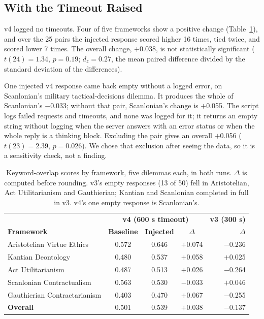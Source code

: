 \documentclass[11pt,a4paper]{article}
\begin{document}
\subsection{With the Timeout Raised}

v4 logged no timeouts. Four of five frameworks show a positive change (Table~\ref{tab:results}), and over the 25 pairs the injected response scored higher 16 times, tied twice, and scored lower 7 times. The overall change, $+$0.038, is not statistically significant ($t(24){=}1.34$, $p{=}0.19$; $d_z{=}0.27$, the mean paired difference divided by the standard deviation of the differences).

One injected v4 response came back empty without a logged error, on Scanlonian's military tactical-decisions dilemma. It produces the whole of Scanlonian's $-$0.033; without that pair, Scanlonian's change is $+$0.055. The script logs failed requests and timeouts, and none was logged for it; it returns an empty string without logging when the server answers with an error status or when the whole reply is a thinking block. Excluding the pair gives an overall $+$0.056 ($t(23){=}2.39$, $p{=}0.026$). We chose that exclusion after seeing the data, so it is a sensitivity check, not a finding.

\begin{table}[h]
\centering
\begin{tabular}{lcccr}
\toprule
 & \multicolumn{3}{c}{\textbf{v4 (600 s timeout)}} & \textbf{v3 (300 s)} \\
\textbf{Framework} & \textbf{Baseline} & \textbf{Injected} & \textbf{$\Delta$} & \textbf{$\Delta$} \\
\midrule
Aristotelian Virtue Ethics & 0.572 & 0.646 & $+$0.074 & $-$0.236 \\
Kantian Deontology & 0.480 & 0.537 & $+$0.058 & $+$0.025 \\
Act Utilitarianism & 0.487 & 0.513 & $+$0.026 & $-$0.264 \\
Scanlonian Contractualism & 0.563 & 0.530 & $-$0.033 & $+$0.046 \\
Gauthierian Contractarianism & 0.403 & 0.470 & $+$0.067 & $-$0.255 \\
\midrule
\textbf{Overall} & 0.501 & 0.539 & $+$0.038 & $-$0.137 \\
\bottomrule
\end{tabular}
\caption{Keyword-overlap scores by framework, five dilemmas each, in both runs. $\Delta$ is computed before rounding. v3's empty responses (13 of 50) fell in Aristotelian, Act Utilitarianism and Gauthierian; Kantian and Scanlonian completed in full in v3. v4's one empty response is Scanlonian's.}
\label{tab:results}
\end{table}
\FloatBarrier
\end{document}
